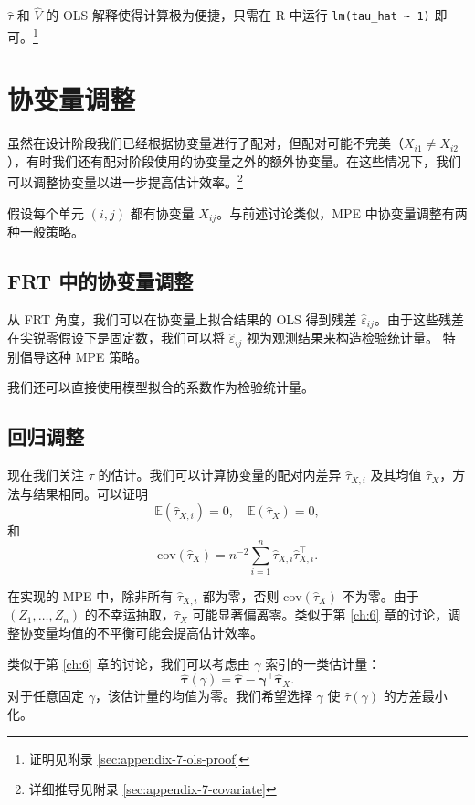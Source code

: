 $\hat\tau$ 和 $\hat V$ 的 OLS 解释使得计算极为便捷，只需在 R 中运行 \texttt{lm(tau\_hat \~{} 1)} 即可。\footnote{证明见附录 \cref{sec:appendix-7-ols-proof}}

\section{协变量调整}\label{sec:7-covariate}

虽然在设计阶段我们已经根据协变量进行了配对，但配对可能不完美（$X_{i1} \neq X_{i2}$），有时我们还有配对阶段使用的协变量之外的额外协变量。在这些情况下，我们可以调整协变量以进一步提高估计效率。\footnote{详细推导见附录 \cref{sec:appendix-7-covariate}}

假设每个单元 $(i,j)$ 都有协变量 $X_{ij}$。与前述讨论类似，MPE 中协变量调整有两种一般策略。

\subsection{FRT 中的协变量调整}\label{sec:7-frt-covariate}

从 FRT 角度，我们可以在协变量上拟合结果的 OLS 得到残差 $\hat\varepsilon_{ij}$。由于这些残差在尖锐零假设下是固定数，我们可以将 $\hat\varepsilon_{ij}$ 视为观测结果来构造检验统计量。\citet{Rosenbaum:2002a} 特别倡导这种 MPE 策略。

我们还可以直接使用模型拟合的系数作为检验统计量。

\subsection{回归调整}\label{sec:7-regression-adjustment}

现在我们关注 $\tau$ 的估计。我们可以计算协变量的配对内差异 $\hat\tau_{X,i}$ 及其均值 $\hat\tau_X$，方法与结果相同。可以证明
\[
\mathbb{E}(\hat\tau_{X,i}) = 0, \quad \mathbb{E}(\hat\tau_X) = 0,
\]
和
\[
\text{cov}(\hat\tau_X) = n^{-2} \sum_{i=1}^n \hat\tau_{X,i} \hat\tau_{X,i}^\top.
\]

在实现的 MPE 中，除非所有 $\hat\tau_{X,i}$ 都为零，否则 $\text{cov}(\hat\tau_X)$ 不为零。由于 $(Z_1, \ldots, Z_n)$ 的不幸运抽取，$\hat\tau_X$ 可能显著偏离零。类似于第 \ref{ch:6} 章的讨论，调整协变量均值的不平衡可能会提高估计效率。

类似于第 \ref{ch:6} 章的讨论，我们可以考虑由 $\gamma$ 索引的一类估计量：
\begin{equation}
\hat{\boldsymbol\tau}(\gamma) = \hat{\boldsymbol\tau} - \boldsymbol\gamma^\top \hat{\boldsymbol\tau}_X.
\label{eq:7-adjusted-estimator}
\end{equation}
对于任意固定 $\gamma$，该估计量的均值为零。我们希望选择 $\gamma$ 使 $\hat\tau(\gamma)$ 的方差最小化。

